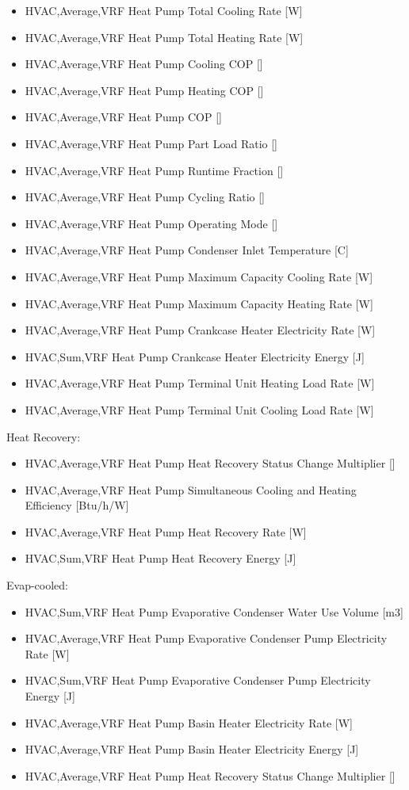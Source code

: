 \begin{itemize}
\item
  HVAC,Average,VRF Heat Pump Total Cooling Rate {[}W{]}
\item
  HVAC,Average,VRF Heat Pump Total Heating Rate {[}W{]}
\item
  HVAC,Average,VRF Heat Pump Cooling COP {[]}
\item
  HVAC,Average,VRF Heat Pump Heating COP {[]}
\item
  HVAC,Average,VRF Heat Pump COP {[]}
\item
  HVAC,Average,VRF Heat Pump Part Load Ratio {[]}
\item
  HVAC,Average,VRF Heat Pump Runtime Fraction {[]}
\item
  HVAC,Average,VRF Heat Pump Cycling Ratio {[]}
\item
  HVAC,Average,VRF Heat Pump Operating Mode {[]}
\item
  HVAC,Average,VRF Heat Pump Condenser Inlet Temperature {[}C{]}
\item
  HVAC,Average,VRF Heat Pump Maximum Capacity Cooling Rate {[}W{]}
\item
  HVAC,Average,VRF Heat Pump Maximum Capacity Heating Rate {[}W{]}
\item
  HVAC,Average,VRF Heat Pump Crankcase Heater Electricity Rate {[}W{]}
\item
  HVAC,Sum,VRF Heat Pump Crankcase Heater Electricity Energy {[}J{]}
\item
  HVAC,Average,VRF Heat Pump Terminal Unit Heating Load Rate {[}W{]}
\item
  HVAC,Average,VRF Heat Pump Terminal Unit Cooling Load Rate {[}W{]}
\end{itemize}

Heat Recovery:

\begin{itemize}
\item
  HVAC,Average,VRF Heat Pump Heat Recovery Status Change Multiplier {[]}
\item
  HVAC,Average,VRF Heat Pump Simultaneous Cooling and Heating Efficiency {[}Btu/h/W{]}
\item
  HVAC,Average,VRF Heat Pump Heat Recovery Rate {[W]}
\item
  HVAC,Sum,VRF Heat Pump Heat Recovery Energy {[J]}
\end{itemize}

Evap-cooled:

\begin{itemize}
\item
  HVAC,Sum,VRF Heat Pump Evaporative Condenser Water Use Volume {[}m3{]}
\item
  HVAC,Average,VRF Heat Pump Evaporative Condenser Pump Electricity Rate {[}W{]}
\item
  HVAC,Sum,VRF Heat Pump Evaporative Condenser Pump Electricity Energy {[}J{]}
\item
  HVAC,Average,VRF Heat Pump Basin Heater Electricity Rate {[}W{]}
\item
  HVAC,Average,VRF Heat Pump Basin Heater Electricity Energy {[}J{]}
\item
  HVAC,Average,VRF Heat Pump Heat Recovery Status Change Multiplier {[]}
\end{itemize}

